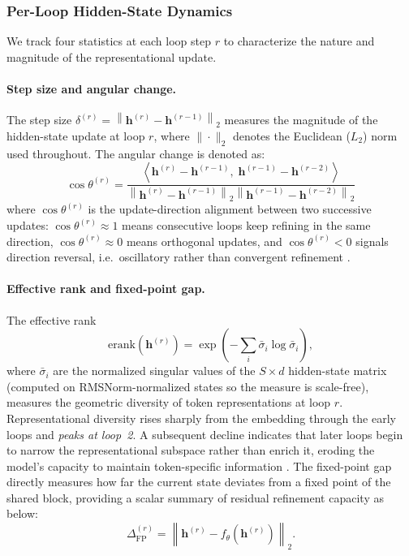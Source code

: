 \documentclass{llmxive}
\providecommand{\hidden}{\mathbf{h}}
\providecommand{\block}{f_\theta}
\begin{document}
\subsubsection{Per-Loop Hidden-State Dynamics}
\label{sec:analysis-dynamics}

We track four statistics at each loop step $r$ to characterize the nature
and magnitude of the representational update.

\paragraph{Step size and angular change.}
The step size $\delta^{(r)} = \left\|\hidden^{(r)} - \hidden^{(r-1)}\right\|_2$ measures the magnitude of the hidden-state update at loop $r$, where
$\|\cdot\|_2$ denotes the Euclidean ($L_2$) norm used throughout.
The angular change is denoted as:
\begin{equation}
  \cos\theta^{(r)} = \frac{
    \left\langle \hidden^{(r)} - \hidden^{(r-1)},\;
                  \hidden^{(r-1)} - \hidden^{(r-2)} \right\rangle
  }{\left\|\hidden^{(r)} - \hidden^{(r-1)}\right\|_2
    \left\|\hidden^{(r-1)} - \hidden^{(r-2)}\right\|_2}
  \label{eq:angular}
\end{equation} where $\cos\theta^{(r)}$ is the update-direction alignment between two successive updates: $\cos\theta^{(r)}\!\approx\!1$ means consecutive loops keep refining in the same direction, $\cos\theta^{(r)}\!\approx\!0$ means orthogonal updates, and $\cos\theta^{(r)}\!<\!0$ signals direction reversal, i.e.\ oscillatory rather than convergent refinement \citep{pappone2025twoscale}.

\paragraph{Effective rank and fixed-point gap.}
The effective rank
\begin{equation}
  \mathrm{erank}(\hidden^{(r)}) =
  \exp\!\left(-\sum_i \bar\sigma_i \log \bar\sigma_i\right),
  \label{eq:erank}
\end{equation}
where $\bar\sigma_i$ are the normalized singular values of the $S \times d$
hidden-state matrix (computed on RMSNorm-normalized states so the measure is
scale-free), measures the geometric diversity of token representations at
loop $r$.
Representational diversity rises sharply from the embedding through the early
loops and \emph{peaks at loop~2}. A subsequent decline indicates that later
loops begin to narrow the representational subspace rather than enrich it,
eroding the model's capacity to maintain token-specific information
\citep{chen2026loop}.
The fixed-point gap directly measures how far the current state deviates from a fixed point of the shared block, providing a scalar summary of residual refinement capacity as below:
\begin{equation}
  \Delta_{\text{FP}}^{(r)} =
  \left\|\hidden^{(r)} - \block\!\left(\hidden^{(r)}\right)\right\|_2.
  \label{eq:fpgap}
\end{equation}
\end{document}
